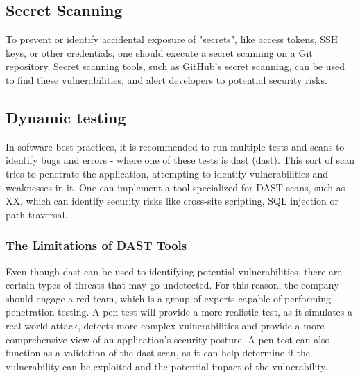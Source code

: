 \subsection{Secret Scanning}
To prevent or identify accidental exposure of "secrets", like access tokens, SSH keys, or other credentials, one should execute a secret scanning on a Git repository. Secret scanning tools, such as GitHub's secret scanning, can be used to find these vulnerabilities, and alert developers to potential security risks. \cite{GithubSecretScanning}

\subsection{Dynamic testing}
In software best practices, it is recommended to run multiple tests and scans to identify bugs and errors - where one of these tests is \acrlong{dast} (\acrshort{dast}).\cite{bestpracticeSupplyChain} This sort of scan tries to penetrate the application, attempting to identify vulnerabilities and weaknesses in it. One can implement a tool specialized for DAST scans, such as XX, which can identify security risks like cross-site scripting, SQL injection or path traversal.\cite{dynamictesting}


\subsubsection{The Limitations of DAST Tools}
Even though \acrshort{dast} can be used to identifying potential vulnerabilities, there are certain types of threats that may go undetected. For this reason, the company should engage a red team, which is a group of experts capable of performing penetration testing. A pen test will provide a more realistic test, as it simulates a real-world attack, detects more complex vulnerabilities and provide a more comprehensive view of an application's security posture. A pen test can also function as a validation of the \acrshort{dast} scan, as it can help determine if the vulnerability can be exploited and the potential impact of the vulnerability. \cite{dastpentesting}



